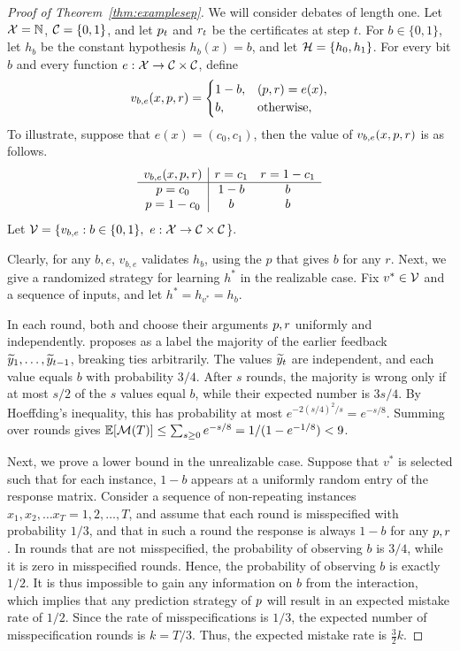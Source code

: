 \documentclass[11pt,letterpaper]{article}
\theoremstyle{definition}
\theoremstyle{plain}
\begin{document}
\begin{proof}[Proof of Theorem~\ref{thm:examplesep}]
We will consider debates of length one. Let ${\mathcal X}=\mathbb{N}$, ${{\mathcal C}}=\{0,1\}$, and let ${p}_t$ and ${r}_t$ be the certificates at step $t$. For $b\in\{0,1\}$, let $h_b$ be the constant hypothesis $h_b(x)=b$, and let ${{\mathcal H}}=\{h_0,h_1\}$. For every bit $b$ and every function $e:{\mathcal X}\to {{\mathcal C}}\times{{\mathcal C}}$, define
\[
v_{b,e}(x,{p},{r})=
\begin{cases}
1-b, & ({p},{r})=e(x),\\
b, & \text{otherwise},
\end{cases}
\]
To illustrate, suppose that $e(x) = (c_0,c_1)$, then the value of $v_{b,e}(x,{p},{r})$ is as follows.
\[
\begin{array}{c|cc}
v_{b,e}(x,{p},{r}) & {r}=c_1 & {r}=1-c_1\\
\hline
{p}=c_0 & 1-b & b\\
{p}=1-c_0 & b & b
\end{array}
\]
Let ${\mathcal V}=\{v_{b,e}:b\in\{0,1\},\ e:{\mathcal X}\to {{\mathcal C}}\times{{\mathcal C}}$\}. 

Clearly, for any $b,e$, $v_{b,e}$ validates $h_b$, using the $p$ that gives $b$ for any $r$. %
Next, we give a randomized strategy for learning $h^*$ in the realizable case. Fix $v^*\in{\mathcal V}$ and a sequence of inputs, and let $h^*=h_{v^*}=h_b$. 


In each round, both \dt and \df choose their arguments ${p},{r}$ uniformly and independently. \dt proposes as a label the majority of the earlier feedback ${\widetilde{y}}_1,\ldots,{\widetilde{y}}_{t-1}$, breaking ties arbitrarily. 
The values ${\widetilde{y}}_t$ are independent, and each value equals $b$ with probability $3/4$. After $s$ rounds, the majority is wrong only if at most $s/2$ of the $s$ values equal $b$, while their expected number is $3s/4$. By Hoeffding's inequality, this has probability at most $e^{-2(s/4)^2/s}=e^{-s/8}$. Summing over rounds gives $\mathbb{E}[{\mathcal M}(T)]\le\sum_{s\ge0}e^{-s/8}=1/(1-e^{-1/8})<9$. 


Next, we prove a lower bound in the unrealizable case. Suppose that $v^*$ is selected such that for each instance, $1-b$ appears at a uniformly random entry of the response matrix. Consider a sequence of non-repeating instances $x_1,x_2,\ldots x_T = 1,2,\ldots, T$, and assume that each round is misspecified with probability $1/3$, and that in such a round the response is always $1-b$ for any ${p},{r}$. In rounds that are not misspecified, the probability of observing $b$ is $3/4$, while it is zero in misspecified rounds. Hence, the probability of observing $b$ is exactly $1/2$. It is thus impossible to gain any information on $b$ from the interaction, which implies that any prediction strategy of ${p}$ will result in an expected mistake rate of $1/2$. Since the rate of misspecifications is $1/3$, the expected number of misspecification rounds is $k = T/3$. Thus, the expected mistake rate is $\frac{3}{2}k$. 
\end{proof}
\end{document}
